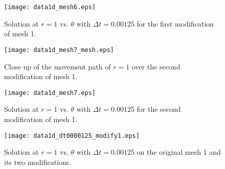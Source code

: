 \documentclass{article}
\begin{document}
\begin{figure}[H]
\centering
\texttt{[image: data1d\_mesh6.eps]}
\caption{Solution at $r=1$ vs. $\theta$ with $\Delta t=0.00125$ for the first modification of mesh 1.}
\label{fig_modified_2}
\end{figure}

\begin{figure}[H]
\centering
\texttt{[image: data1d\_mesh7\_mesh.eps]}
\caption{Close up of the movement path of $r=1$ over the second modification of mesh 1.}
\label{fig_modified_3}
\end{figure}

\begin{figure}[H]
\centering
\texttt{[image: data1d\_mesh7.eps]}
\caption{Solution at $r=1$ vs. $\theta$ with $\Delta t=0.00125$ for the second modification of mesh 1.}
\label{fig_modified_4}
\end{figure}

\begin{figure}[H]
\centering
\texttt{[image: data1d\_dt0000125\_modify1.eps]}
\caption{Solution at $r=1$ vs. $\theta$ with $\Delta t=0.00125$ on the original mesh 1 and its two modifications.}
\label{fig_modified_5}
\end{figure}











\end{document}
